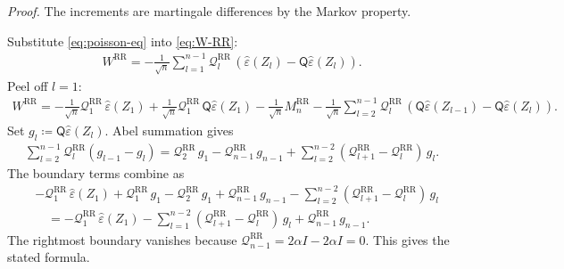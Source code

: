 \textit{Proof.} The increments are martingale differences by the Markov property.

Substitute \eqref{eq:poisson-eq} into \eqref{eq:W-RR}:
\begin{equation}
\begin{aligned}
W^{\text{RR}}
  = -\frac{1}{\sqrt{n}} \sum_{l = 1}^{n - 1}
    \mathcal{Q}_l^{\text{RR}} \, (\widehat{\varepsilon}(Z_l) - \mathsf{Q} \widehat{\varepsilon}(Z_l)).
\end{aligned}
\end{equation}
Peel off \(l = 1\):
\begin{equation}
\begin{aligned}
W^{\text{RR}}
  = -\frac{1}{\sqrt{n}} \mathcal{Q}_1^{\text{RR}} \, \widehat{\varepsilon}(Z_1)
    + \frac{1}{\sqrt{n}} \mathcal{Q}_1^{\text{RR}} \, \mathsf{Q} \widehat{\varepsilon}(Z_1)
    - \frac{1}{\sqrt{n}} M_n^{\text{RR}}
    - \frac{1}{\sqrt{n}} \sum_{l = 2}^{n - 1}
      \mathcal{Q}_l^{\text{RR}} \, (\mathsf{Q} \widehat{\varepsilon}(Z_{l - 1}) - \mathsf{Q} \widehat{\varepsilon}(Z_l)).
\end{aligned}
\end{equation}
Set \(g_l \coloneqq \mathsf{Q} \widehat{\varepsilon}(Z_l)\). Abel summation gives
\begin{equation}
\begin{aligned}
\sum_{l = 2}^{n - 1} \mathcal{Q}_l^{\text{RR}} (g_{l - 1} - g_l)
  = \mathcal{Q}_2^{\text{RR}} \, g_1
    - \mathcal{Q}_{n - 1}^{\text{RR}} \, g_{n - 1}
    + \sum_{l = 2}^{n - 2}
      (\mathcal{Q}_{l + 1}^{\text{RR}} - \mathcal{Q}_l^{\text{RR}}) \, g_l.
\end{aligned}
\end{equation}
The boundary terms combine as
\begin{equation}
\begin{aligned}
&-\mathcal{Q}_1^{\text{RR}} \, \widehat{\varepsilon}(Z_1)
+ \mathcal{Q}_1^{\text{RR}} \, g_1
- \mathcal{Q}_2^{\text{RR}} \, g_1
+ \mathcal{Q}_{n - 1}^{\text{RR}} \, g_{n - 1}
- \sum_{l = 2}^{n - 2}
    (\mathcal{Q}_{l + 1}^{\text{RR}} - \mathcal{Q}_l^{\text{RR}}) \, g_l \\
&\quad= -\mathcal{Q}_1^{\text{RR}} \, \widehat{\varepsilon}(Z_1)
       - \sum_{l = 1}^{n - 2}
          (\mathcal{Q}_{l + 1}^{\text{RR}} - \mathcal{Q}_l^{\text{RR}}) \, g_l
       + \mathcal{Q}_{n - 1}^{\text{RR}} \, g_{n - 1}.
\end{aligned}
\end{equation}
The rightmost boundary vanishes because
\(\mathcal{Q}_{n - 1}^{\text{RR}} = 2 \alpha I - 2 \alpha I = 0\). This gives the stated
formula.


